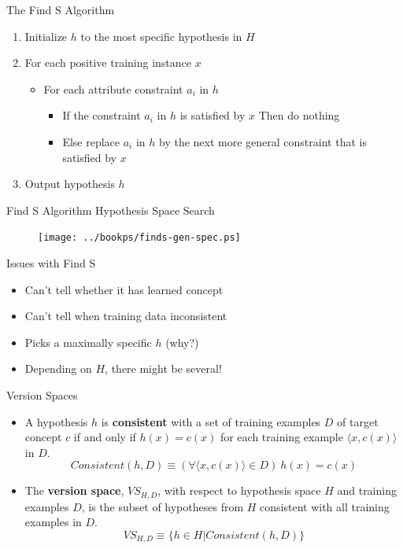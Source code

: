\documentclass[%
pdf,
colorBG,
slideColor,
tcrico,
]{prosper}
\begin{document}


\begin{slide}{The Find S Algorithm}

\begin{enumerate}
\item Initialize $h$ to the most specific hypothesis in $H$
\item For each positive training instance $x$
	\begin{itemize}
	\item For each attribute constraint $a_{i}$ in $h$
		\begin{itemize}
		\item If the constraint $a_{i}$ in $h$ is satisfied by $x$ Then do nothing
		\item Else replace $a_{i}$ in $h$ by the next more general constraint that is satisfied by $x$
		\end{itemize}
	\end{itemize}
\item Output hypothesis $h$
\end{enumerate}
\end{slide}


\begin{slide}{Find S Algorithm Hypothesis Space Search}
\begin{figure}
	\centering
	\texttt{[image: ../bookps/finds-gen-spec.ps]}
\end{figure}
\end{slide}



\begin{slide}{Issues with Find S }
\begin{itemize}
 	\item Can't tell whether it has learned concept
	\item Can't tell when training data inconsistent
	\item Picks a maximally specific $h$ (why?)
	\item Depending on $H$, there might be several!
\end{itemize}
\end{slide}


\begin{slide}{Version Spaces}
\begin{itemize}
 	\item  A hypothesis $h$ is {\bf consistent} with a set of training examples $D$ of
target concept $c$ if and only if $h(x)=c(x)$ for each training example
$\langle x, c(x) \rangle$ in $D$.
\[Consistent(h,D) \equiv (\forall \langle x, c(x) \rangle \in D)\  h(x)=c(x) \]

	\item The {\bf version space}, $VS_{H,D}$, with respect to hypothesis space $H$ and training examples $D$, is the subset of hypotheses from $H$ consistent with all training examples in $D$. \[VS_{H,D} \equiv \{h \in H|Consistent(h,D)\} \]
\end{itemize}
\end{slide}
\end{document}
